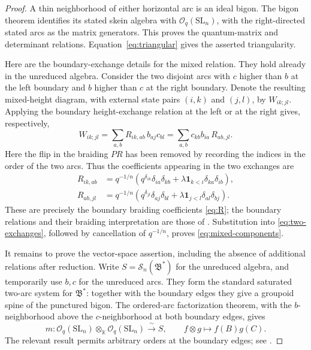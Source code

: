 \documentclass[11pt]{amsart}
\theoremstyle{remark}
\newcommand{\kk}{\mathbb{K}}
\newcommand{\OO}{\mathcal O_q(\mathrm{SL}_n)}
\newcommand{\Sk}{\mathscr S_n}
\newcommand{\Bstar}{\mathfrak B^{*}}
\newcommand{\ind}{\mathbf 1}
\begin{document}
\begin{proof}
A thin neighborhood of either horizontal arc is an ideal bigon.
The bigon theorem \cite[Theorem~6.3]{LS} identifies its stated skein
algebra with $\OO$, with the right-directed stated arcs as the
matrix generators.  This proves the quantum-matrix and determinant
relations.  Equation~\eqref{eq:triangular} gives the asserted
triangularity.


Here are the boundary-exchange details for the mixed relation.
They hold already in the unreduced algebra.  Consider the two
disjoint arcs with $c$ higher than $b$ at the left boundary and $b$
higher than $c$ at the right boundary.  Denote the resulting
mixed-height diagram, with external state pairs $(i,k)$ and
$(j,l)$, by $W_{ik;jl}$.  Applying the boundary height-exchange
relation at the left or at the right gives, respectively,
\begin{equation}\label{eq:two-exchanges}
 W_{ik;jl}
   =\sum_{a,b}R_{ik,ab}\,b_{aj}c_{bl}
   =\sum_{a,b}c_{kb}b_{ia}\,R_{ab,jl}.
\end{equation}
Here the flip in the braiding $PR$ has been removed by recording
the indices in the order of the two arcs.  Thus the coefficients
appearing in the two exchanges are
\[
 \begin{split}
 R_{ik,ab}
 &=q^{-1/n}\left(
      q^{\delta_{ik}}\delta_{ia}\delta_{kb}
      +\lambda\ind_{k<i}\delta_{ka}\delta_{ib}
   \right),\\
 R_{ab,jl}
 &=q^{-1/n}\left(
      q^{\delta_{jl}}\delta_{aj}\delta_{bl}
      +\lambda\ind_{j<l}\delta_{al}\delta_{bj}
   \right).
 \end{split}
\]
These are precisely the boundary braiding coefficients
\eqref{eq:R}; the boundary relations and their braiding
interpretation are those of \cite[Section~4 and Theorem~6.4]{LS}.
Substitution into \eqref{eq:two-exchanges}, followed by cancellation
of $q^{-1/n}$, proves \eqref{eq:mixed-components}.


It remains to prove the vector-space assertion, including the
absence of additional relations after reduction.
Write $S=\Sk(\Bstar)$ for the unreduced algebra, and temporarily
use $b,c$ for the unreduced arcs.  They form the standard saturated
two-arc system for $\Bstar$: together with the boundary edges they
give a groupoid spine of the punctured bigon.  The ordered-arc
factorization theorem, with the $b$-neighborhood above the
$c$-neighborhood at both boundary edges, gives
\begin{equation}\label{eq:unreduced-factorization}
 m:\OO\otimes_\kk\OO\xrightarrow{\ \sim\ }S,\qquad
 f\otimes g\longmapsto f(B)g(C).
\end{equation}
The relevant result permits arbitrary orders at the boundary
edges; see \cite[Corollary~8.14]{LS}.


\end{proof}
\end{document}
